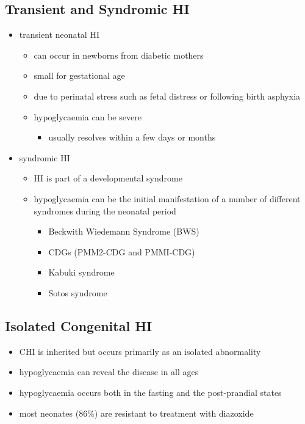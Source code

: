 \documentclass{scrartcl}
\begin{document}
\subsection{Transient and Syndromic HI}
\label{sec:org041994a}
\begin{itemize}
\item transient neonatal HI
\begin{itemize}
\item can occur in newborns from diabetic mothers
\item small for gestational age
\item due to perinatal stress such as fetal distress or following birth asphyxia
\item hypoglycaemia can be severe
\begin{itemize}
\item usually resolves within a few days or months
\end{itemize}
\end{itemize}
\item syndromic HI
\begin{itemize}
\item HI is part of a developmental syndrome
\item hypoglycaemia can be the initial manifestation of a number of
different syndromes during the neonatal period
\begin{itemize}
\item Beckwith Wiedemann Syndrome (BWS)
\item CDGs (PMM2-CDG and PMMI-CDG)
\item Kabuki syndrome
\item Sotos syndrome
\end{itemize}
\end{itemize}
\end{itemize}

\subsection{Isolated Congenital HI}
\label{sec:orgd1b9e91}
\begin{itemize}
\item CHI is inherited but occurs primarily as an isolated abnormality
\item hypoglycaemia can reveal the disease in all ages
\item hypoglycaemia occurs both in the fasting and the post-prandial states
\item most neonates (86\%) are resistant to treatment with diazoxide
\end{itemize}
\end{document}
